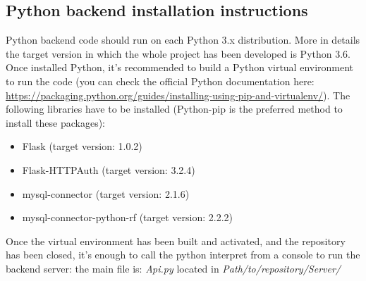 \documentclass{article}
\begin{document}
\subsection{Python backend installation instructions}
Python backend code should run on each Python 3.x distribution. More in details the target version in which the whole project has been developed is Python 3.6.\\
Once installed Python, it's recommended to build a Python virtual environment to run the code (you can check the official Python documentation here: \url{https://packaging.python.org/guides/installing-using-pip-and-virtualenv/}). The following libraries have to be installed (Python-pip is the preferred method to install these packages):
\begin{itemize}
	\item Flask (target version: 1.0.2)
	\item Flask-HTTPAuth (target version: 3.2.4)
	\item mysql-connector (target version: 2.1.6)
	\item mysql-connector-python-rf (target version: 2.2.2)
\end{itemize}
Once the virtual environment has been built and activated, and the repository has been closed, it's enough to call the python interpret from a console to run the backend server: the main file is: \textit{Api.py} located in \textit{Path/to/repository/Server/} 
\end{document}

